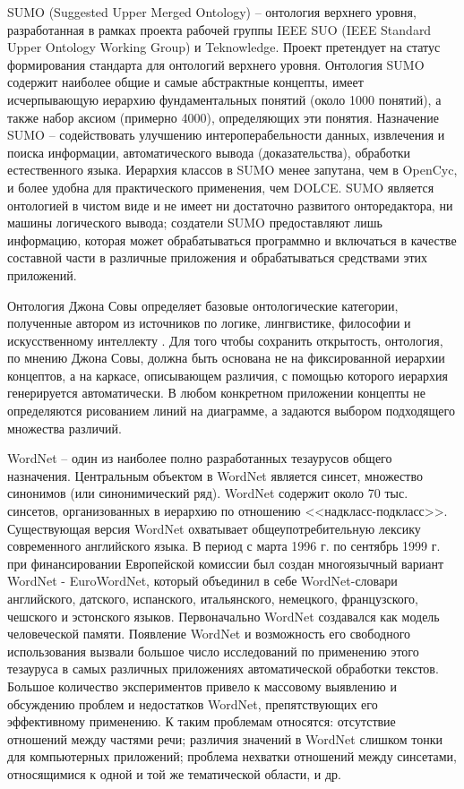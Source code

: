 SUMO (Suggested Upper Merged Ontology) \cite{SUMO} -- онтология верхнего уровня, разработанная в рамках проекта рабочей группы IEEE SUO (IEEE Standard Upper Ontology Working Group) и Teknowledge. Проект претендует на статус формирования стандарта для онтологий верхнего уровня. Онтология SUMO содержит наиболее общие и самые абстрактные концепты, имеет исчерпывающую иерархию фундаментальных понятий (около 1000 понятий), а также набор аксиом (примерно 4000), определяющих эти понятия. Назначение SUMO -- содействовать улучшению интероперабельности данных, извлечения и поиска информации, автоматического вывода (доказательства), обработки естественного языка. Иерархия классов в SUMO менее запутана, чем в OpenCyc, и более удобна для практического применения, чем DOLCE. SUMO является онтологией в чистом виде и не имеет ни достаточно развитого онторедактора, ни машины логического вывода; создатели SUMO предоставляют лишь информацию, которая может обрабатываться программно и включаться в качестве составной части в различные приложения и обрабатываться средствами этих приложений.

Онтология Джона Совы определяет базовые онтологические категории, полученные автором из
источников по логике, лингвистике, философии и искусственному интеллекту \cite{Sowa1995}. Для того чтобы сохранить открытость, онтология, по мнению Джона Совы, должна быть основана не на фиксированной иерархии концептов, а на каркасе, описывающем различия, с помощью которого иерархия генерируется автоматически. В любом конкретном приложении концепты не определяются рисованием линий на диаграмме, а задаются выбором подходящего множества различий.

WordNet \cite{WordNet} -- один из наиболее полно разработанных тезаурусов общего назначения. Центральным объектом в WordNet является синсет, множество синонимов (или синонимический ряд). WordNet содержит около 70 тыс. синсетов, организованных в иерархию по отношению <<надкласс-подкласс>>. Существующая версия WordNet охватывает общеупотребительную лексику современного английского языка. В период с марта 1996 г. по сентябрь 1999 г. при финансировании Европейской комиссии был создан многоязычный вариант WordNet - EuroWordNet, который объединил в себе WordNet-словари английского, датского, испанского, итальянского, немецкого, французского, чешского и эстонского языков. Первоначально WordNet создавался как модель человеческой памяти. Появление WordNet и возможность его свободного использования вызвали большое число исследований по применению этого тезауруса в самых различных приложениях автоматической обработки текстов. Большое количество экспериментов привело к массовому выявлению и обсуждению проблем и недостатков WordNet, препятствующих его эффективному применению. К таким проблемам относятся: отсутствие отношений между частями речи; различия значений в WordNet слишком тонки для компьютерных приложений; проблема нехватки отношений между синсетами, относящимися к одной и той же тематической области, и др.

